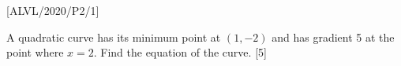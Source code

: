 \item {[}ALVL/2020/P2/1{]}

A quadratic curve has its minimum point at $\left(1,-2\right)$ and
has gradient 5 at the point where $x=2$. Find the equation of the
curve.\hfill{} {[}5{]}
